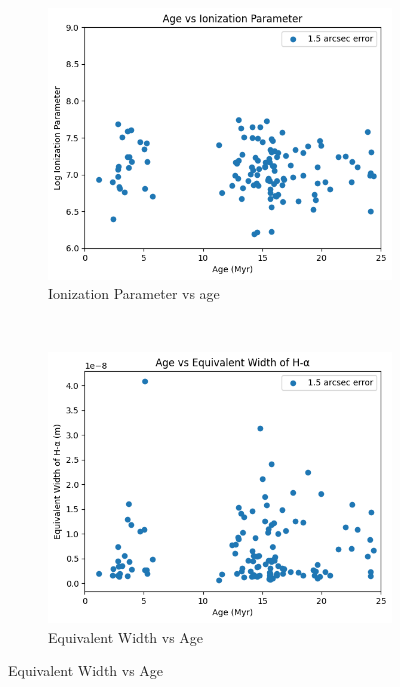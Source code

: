 \documentclass{beamer}
\begin{document}
\begin{frame}
    \begin{figure}
        \centering
        \begin{subfigure}{0.45\textwidth}
            \includegraphics[scale = 0.3]{image24.png}
            \caption{Ionization Parameter vs age}
        \end{subfigure}
        ~
        \begin{subfigure}{0.45\textwidth}
            \includegraphics[scale = 0.3]{image25.png}
            \caption{Equivalent Width vs Age}
        \end{subfigure}
    \end{figure}


\end{frame}
\end{document}
